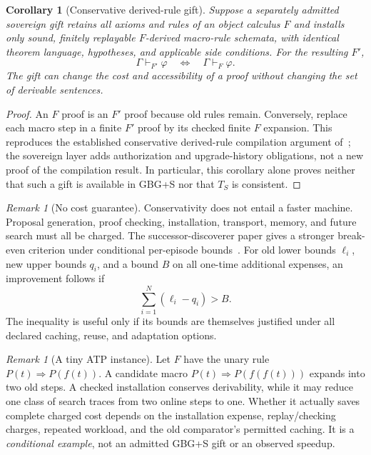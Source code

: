 \documentclass[11pt,letterpaper]{article}
\newtheorem{corollary}[definition]{Corollary}
\theoremstyle{remark}
\newtheorem{remark}[definition]{Remark}
\begin{document}
\begin{corollary}[Conservative derived-rule gift]\label{cor:macro}
Suppose a separately admitted sovereign gift retains all axioms and rules of an object calculus $F$ and installs only sound, finitely replayable $F$-derived macro-rule schemata, with identical theorem language, hypotheses, and applicable side conditions. For the resulting $F'$,
\[
\Gamma\vdash_{F'}\varphi\quad\Longleftrightarrow\quad\Gamma\vdash_F\varphi.
\]
The gift can change the cost and accessibility of a proof without changing the set of derivable sentences.
\end{corollary}
\begin{proof}
An $F$ proof is an $F'$ proof because old rules remain. Conversely, replace each macro step in a finite $F'$ proof by its checked finite $F$ expansion. This reproduces the established conservative derived-rule compilation argument of~\cite{Successor}; the sovereign layer adds authorization and upgrade-history obligations, not a new proof of the compilation result. In particular, this corollary alone proves neither that such a gift is available in GBG+S nor that $T_S$ is consistent.\end{proof}

\begin{remark}[No cost guarantee]
Conservativity does not entail a faster machine. Proposal generation, proof checking, installation, transport, memory, and future search must all be charged. The successor-discoverer paper gives a stronger break-even criterion under conditional per-episode bounds~\cite{Successor}. For old lower bounds $\ell_i$, new upper bounds $q_i$, and a bound $B$ on all one-time additional expenses, an improvement follows if
\[
\sum_{i=1}^{N}(\ell_i-q_i)>B.
\]
The inequality is useful only if its bounds are themselves justified under all declared caching, reuse, and adaptation options.
\end{remark}

\begin{remark}[A tiny ATP instance]
Let $F$ have the unary rule $P(t)\Rightarrow P(f(t))$. A candidate macro $P(t)\Rightarrow P(f(f(t)))$ expands into two old steps. A checked installation conserves derivability, while it may reduce one class of search traces from two online steps to one. Whether it actually saves complete charged cost depends on the installation expense, replay/checking charges, repeated workload, and the old comparator's permitted caching. It is a \emph{conditional example}, not an admitted GBG+S gift or an observed speedup.
\end{remark}
\end{document}
